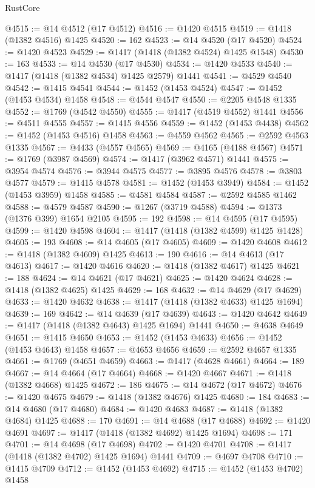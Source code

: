 \begin{lexlean}{RustCore}
\begin{coremodule}
@4515 := @14 @4512 (@17 @4512)
@4516 := @1420 @4515
@4519 := @1418 (@1382 @4516) @1425
@4520 := 162
@4523 := @14 @4520 (@17 @4520)
@4524 := @1420 @4523
@4529 := @1417 (@1418 (@1382 @4524) @1425 @1548)
@4530 := 163
@4533 := @14 @4530 (@17 @4530)
@4534 := @1420 @4533
@4540 := @1417 (@1418 (@1382 @4534) @1425 @2579) @1441
@4541 := @4529 @4540
@4542 := @1415 @4541
@4544 := @1452 (@1453 @4524)
@4547 := @1452 (@1453 @4534) @1458
@4548 := @4544 @4547
@4550 := @2205 @4548 @1335
@4552 := @1769 (@4542 @4550)
@4555 := @1417 (@4519 @4552) @1441
@4556 := @4511 @4555
@4557 := @1415 @4556
@4559 := @1452 (@1453 @4438)
@4562 := @1452 (@1453 @4516) @1458
@4563 := @4559 @4562
@4565 := @2592 @4563 @1335
@4567 := @4433 (@4557 @4565)
@4569 := @4165 (@4188 @4567)
@4571 := @1769 (@3987 @4569)
@4574 := @1417 (@3962 @4571) @1441
@4575 := @3954 @4574
@4576 := @3944 @4575
@4577 := @3895 @4576
@4578 := @3803 @4577
@4579 := @1415 @4578
@4581 := @1452 (@1453 @3949)
@4584 := @1452 (@1453 @3959) @1458
@4585 := @4581 @4584
@4587 := @2592 @4585 @1462
@4588 := @4579 @4587
@4590 := @1267 (@3719 @4588)
@4594 := @1373 (@1376 @399) @1654 @2105
@4595 := 192
@4598 := @14 @4595 (@17 @4595)
@4599 := @1420 @4598
@4604 := @1417 (@1418 (@1382 @4599) @1425 @1428)
@4605 := 193
@4608 := @14 @4605 (@17 @4605)
@4609 := @1420 @4608
@4612 := @1418 (@1382 @4609) @1425
@4613 := 190
@4616 := @14 @4613 (@17 @4613)
@4617 := @1420 @4616
@4620 := @1418 (@1382 @4617) @1425
@4621 := 188
@4624 := @14 @4621 (@17 @4621)
@4625 := @1420 @4624
@4628 := @1418 (@1382 @4625) @1425
@4629 := 168
@4632 := @14 @4629 (@17 @4629)
@4633 := @1420 @4632
@4638 := @1417 (@1418 (@1382 @4633) @1425 @1694)
@4639 := 169
@4642 := @14 @4639 (@17 @4639)
@4643 := @1420 @4642
@4649 := @1417 (@1418 (@1382 @4643) @1425 @1694) @1441
@4650 := @4638 @4649
@4651 := @1415 @4650
@4653 := @1452 (@1453 @4633)
@4656 := @1452 (@1453 @4643) @1458
@4657 := @4653 @4656
@4659 := @2592 @4657 @1335
@4661 := @1769 (@4651 @4659)
@4663 := @1417 (@4628 @4661)
@4664 := 189
@4667 := @14 @4664 (@17 @4664)
@4668 := @1420 @4667
@4671 := @1418 (@1382 @4668) @1425
@4672 := 186
@4675 := @14 @4672 (@17 @4672)
@4676 := @1420 @4675
@4679 := @1418 (@1382 @4676) @1425
@4680 := 184
@4683 := @14 @4680 (@17 @4680)
@4684 := @1420 @4683
@4687 := @1418 (@1382 @4684) @1425
@4688 := 170
@4691 := @14 @4688 (@17 @4688)
@4692 := @1420 @4691
@4697 := @1417 (@1418 (@1382 @4692) @1425 @1694)
@4698 := 171
@4701 := @14 @4698 (@17 @4698)
@4702 := @1420 @4701
@4708 := @1417 (@1418 (@1382 @4702) @1425 @1694) @1441
@4709 := @4697 @4708
@4710 := @1415 @4709
@4712 := @1452 (@1453 @4692)
@4715 := @1452 (@1453 @4702) @1458

\end{coremodule}
\end{lexlean}
